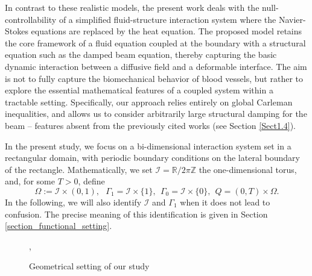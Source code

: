 \documentclass[a4paper, 12pt]{article}
\theoremstyle{plain}
\theoremstyle{definition}
\numberwithin{theorem}{section}
\numberwithin{equation}{section}
\def\R{\mathbb{R}}
\def\Z{\mathbb{Z}}
\begin{document}
In contrast to these realistic models, the present work deals with the null-controllability of a simplified fluid-structure interaction system where the Navier-Stokes equations are replaced by the heat equation. The proposed model retains the core framework of a fluid equation coupled at the boundary with a structural equation such as the damped beam equation, thereby capturing the basic dynamic interaction between a diffusive field and a deformable interface. The aim is not to fully capture the biomechanical behavior of blood vessels, but rather to explore the essential mathematical features of a coupled system within a tractable setting. Specifically, our approach relies entirely on global Carleman inequalities, and allows us to consider arbitrarily large structural damping for the beam -- features absent from the previously cited works  (see Section \ref{Sect1.4}). 


In the present study, we focus on a bi-dimensional interaction system set in a rectangular domain, with periodic boundary  conditions on the lateral boundary of the rectangle. Mathematically, we set $\mathcal I = \R / 2\pi \Z$ the one-dimensional torus, and, for some $T>0$, define 
$$\Omega:=\mathcal{I}\times (0,1),~~~\Gamma_1=\mathcal{I}\times\{1\},~~\Gamma_0=\mathcal{I}\times\{0\},~~ Q=(0,T)\times\Omega.$$
In the following, we will also identify $\mathcal I$ and $\Gamma_1$ when it does not lead to confusion. The precise meaning of this identification is given in Section \ref{section_functional_setting}.

\begin{figure}[h!]
\centering
{},
\caption{Geometrical setting of our study}
\label{fig}
\end{figure}
\end{document}
